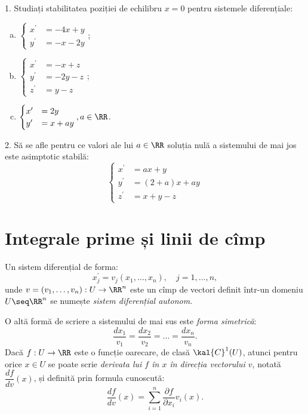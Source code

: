 1. Studiați stabilitatea poziției de echilibru $ x = 0 $ pentru sistemele
diferențiale:
\begin{enumerate}[(a)]
\item $ \begin{cases}
    x^\prime &= -4x + y \\
    y^\prime &= -x - 2y
  \end{cases} $;
\item $ \begin{cases}
    x^\prime &= -x + z \\
    y^\prime &= -2y - z \\
    z^\prime &= y - z
  \end{cases} $;
\item $ \begin{cases}
    x^\prime &= 2y \\
    y^\prime &= x + ay
  \end{cases}, a \in \RR $.
\end{enumerate}

\vspace{0.3cm}

2. Să se afle pentru ce valori ale lui $ a \in \RR $ soluția nulă a
sistemului de mai jos este asimptotic stabilă:
\[
  \begin{cases}
    x^\prime &= ax + y \\
    y^\prime &= (2 + a)x + ay \\
    z^\prime &= x + y - z
  \end{cases}
\]


\section{Integrale prime și linii de cîmp}

\begin{definition}\label{def:sist-autonom}
  Un sistem diferențial de forma:
  \[
    x^\prime_j = v_j(x_1, \dots, x_n), \quad j = 1, \dots, n,
  \]
  unde $ v = (v_1, \dots, v_n) : U \to \RR^n $ este un cîmp de vectori definit
  într-un domeniu $ U \seq \RR^n $ se numește \emph{sistem diferențial autonom}.
\end{definition}

O altă formă de scriere a sistemului de mai sus este \emph{forma simetrică}:
\[
  \dfrac{dx_1}{v_1} = \dfrac{dx_2}{v_2} = \dots = \dfrac{dx_n}{v_n}.
\]
Dacă $ f : U \to \RR $ este o funcție oarecare, de clasă $ \kal{C}^1(U) $, atunci
pentru orice $ x \in U $ se poate scrie \emph{derivata lui $ f $ în $ x $ %
  în direcția vectorului $ v $}, notată $ \dfrac{df}{dv}(x) $, și definită
prin formula cunoscută:
\[
  \dfrac{df}{dv}(x) = \sum_{i = 1}^n \dfrac{\partial f}{\partial x_i} v_i(x).
\]

